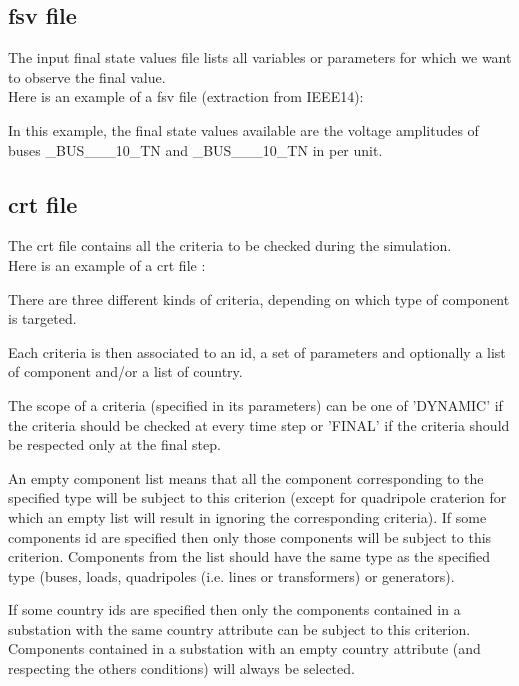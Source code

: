 \documentclass[a4paper, 12pt]{report}
\begin{document}
\subsection{fsv file}

The input final state values file lists all variables or parameters for which we want to observe the final value. \\

Here is an example of a fsv file (extraction from IEEE14):


In this example, the final state values available are the voltage amplitudes of buses \_BUS\_\_\_10\_TN and \_BUS\_\_\_10\_TN in per unit.

\subsection{crt file}

The crt file contains all the criteria to be checked during the
simulation.
\\

Here is an example of a crt file :


There are three different kinds of criteria, depending on which type of
component is targeted.

Each criteria is then associated to an id, a set of parameters and optionally a
list of component and/or a list of country.

The scope of a criteria (specified in its parameters) can be one of 'DYNAMIC' if
the criteria should be checked at every time step or 'FINAL' if the criteria
should be respected only at the final step.

An empty component list means that all the component corresponding to the specified type will be subject to this
criterion (except for quadripole craterion for which an empty list will result in ignoring the corresponding criteria).
If some components id are specified then only those components will
be subject to this criterion. Components from the list should have the same type as the
specified type (buses, loads, quadripoles (i.e. lines or transformers) or generators).

If some country ids are specified then only the components contained in a
substation with the same country attribute can be subject to this
criterion. Components contained in a substation with an empty country attribute
(and respecting the others conditions) will always be selected.
\end{document}
